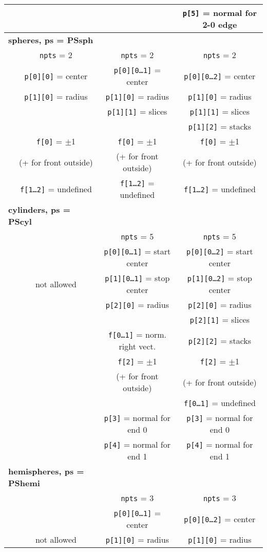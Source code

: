 \documentclass {book}
\begin{document}
\begin{longtable}[c]{lccc}
&&&\texttt{p[5]} = normal for 2-0 edge\\
\hline
\multicolumn{2}{l}{\textbf{spheres, ps = PSsph}}\\
&\texttt{npts} = 2&\texttt{npts} = 2&\texttt{npts} = 2\\ 
&\texttt{p[0][0]} = center&\texttt{p[0][0\ldots1]} = center&\texttt{p[0][0\ldots2]} = center\\ 
&\texttt{p[1][0]} = radius&\texttt{p[1][0]} = radius&\texttt{p[1][0]} = radius\\ 
&&\texttt{p[1][1]} = slices&\texttt{p[1][1]} = slices\\ 
&&&\texttt{p[1][2]} = stacks\\ 
&\texttt{f[0]} = $\pm$1&\texttt{f[0]} = $\pm$1&\texttt{f[0]} = $\pm$1\\ 
&(+ for front outside)&(+ for front outside)&(+ for front outside)\\ 
&\texttt{f[1\ldots2]} = undefined&\texttt{f[1\ldots2]} = undefined&\texttt{f[1\ldots2]} = undefined\\
\hline
\multicolumn{2}{l}{\textbf{cylinders, ps = PScyl}}\\
&&\texttt{npts} = 5&\texttt{npts} = 5\\ 
&&\texttt{p[0][0\ldots1]} = start center&\texttt{p[0][0\ldots2]} = start center\\ 
&not allowed&\texttt{p[1][0\ldots1]} = stop center&\texttt{p[1][0\ldots2]} = stop center\\ 
&&\texttt{p[2][0]} = radius&\texttt{p[2][0]} = radius\\ 
&&&\texttt{p[2][1]} = slices\\ 
&&\texttt{f[0\ldots1]} = norm. right vect.&\texttt{p[2][2]} = stacks\\ 
&&\texttt{f[2]} = $\pm$1&\texttt{f[2]} = $\pm$1\\ 
&&(+ for front outside)&(+ for front outside)\\ 
&&&\texttt{f[0\ldots1]} = undefined\\
&&\texttt{p[3]} = normal for end 0&\texttt{p[3]} = normal for end 0\\
&&\texttt{p[4]} = normal for end 1&\texttt{p[4]} = normal for end 1\\
\hline
\multicolumn{2}{l}{\textbf{hemispheres, ps = PShemi}}\\
&&\texttt{npts} = 3&\texttt{npts} = 3\\ 
&&\texttt{p[0][0\ldots1]} = center&\texttt{p[0][0\ldots2]} = center\\ 
&not allowed&\texttt{p[1][0]} = radius&\texttt{p[1][0]} = radius\\ 

\end{longtable}
\end{document}
